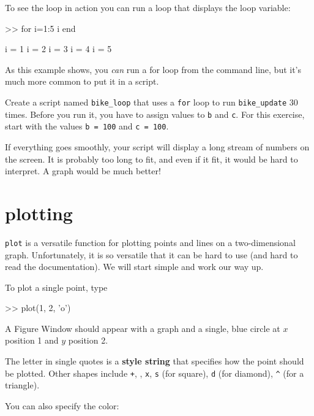 
To see the loop in action you can run a loop that displays the
loop variable:

\begin{code}
>> for i=1:5
    i
end

i = 1
i = 2
i = 3
i = 4
i = 5
\end{code}

As this example shows, you {\em can} run a for loop from the
command line, but it's much more common to put it in a script.

\begin{ex}
Create a script named \verb"bike_loop" that uses a {\tt for} loop to run \verb"bike_update" 30 times.  Before you run it, you have to assign values to {\tt b} and {\tt c}.
For this exercise, start with the values {\tt b = 100} and {\tt c = 100}.

If everything goes smoothly, your script will display a long stream
of numbers on the screen.  It is probably too long
to fit, and even if it fit, it would be hard to interpret.
A graph would be much better!
\end{ex}


\section{plotting}
\label{plotting}


{\tt plot} is a versatile function for plotting points and lines
on a two-dimensional graph.  Unfortunately, it is so versatile
that it can be hard to use (and hard to read the documentation).
We will start simple and work our way up.

To plot a single point, type

\begin{code}
>> plot(1, 2, 'o')
\end{code}

A {\sf Figure Window} should appear with a graph and a single, blue circle
at $x$ position 1 and $y$ position 2.  


The letter in single quotes is a {\bf style string} that specifies how the
point should be plotted.
Other shapes include {\tt +},
{\tt *},
{\tt x},
{\tt s} (for square),
{\tt d} (for diamond), 
\verb+^+ (for a triangle).

You can also specify the color:

